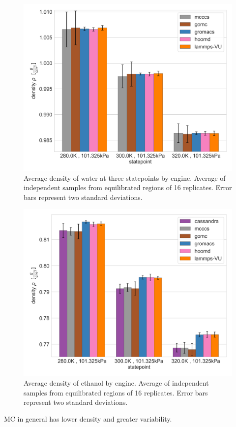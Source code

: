 \begin{figure}[h!]
    \centering
    \includegraphics[width=0.8\linewidth,keepaspectratio]{figures/rep_study/waterSPCE_summary.png}
    \caption{Average density of water at three statepoints by engine. Average of independent samples from equilibrated regions of 16 replicates. Error bars represent two standard deviations.}\label{fig:water_density}
\end{figure}

\begin{figure}[h!]
    \centering
    \includegraphics[width=0.8\linewidth,keepaspectratio]{figures/rep_study/ethanolAA_summary.png}
    \caption{Average density of ethanol by engine. Average of independent samples from equilibrated regions of 16 replicates. Error bars represent two standard deviations.}\label{fig:ethanol_density}
\end{figure}

MC in general has lower density and greater variability.

